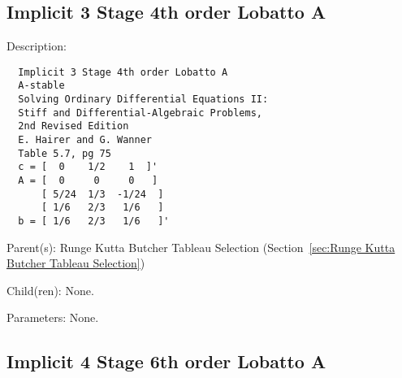 \subsection{Implicit 3 Stage 4th order Lobatto A}
\label{sec:Implicit 3 Stage 4th order Lobatto A}

\begin{list}{}
  {\setlength{\leftmargin}{1.0in}
   \setlength{\labelwidth}{0.75in}
   \setlength{\labelsep}{0.125in}}
  \item[Description:]
\begin{verbatim}
  Implicit 3 Stage 4th order Lobatto A
  A-stable
  Solving Ordinary Differential Equations II:
  Stiff and Differential-Algebraic Problems,
  2nd Revised Edition
  E. Hairer and G. Wanner
  Table 5.7, pg 75
  c = [  0    1/2    1  ]'
  A = [  0     0     0   ]
      [ 5/24  1/3  -1/24  ]
      [ 1/6   2/3   1/6   ]
  b = [ 1/6   2/3   1/6   ]'
\end{verbatim}
  \item[Parent(s):]
    Runge Kutta Butcher Tableau Selection (Section~\ref{sec:Runge Kutta Butcher Tableau Selection})
  \item[Child(ren):]
    None. 
  \item[Parameters:]
    None. 
\end{list}

\subsection{Implicit 4 Stage 6th order Lobatto A}
\label{sec:Implicit 4 Stage 6th order Lobatto A}

